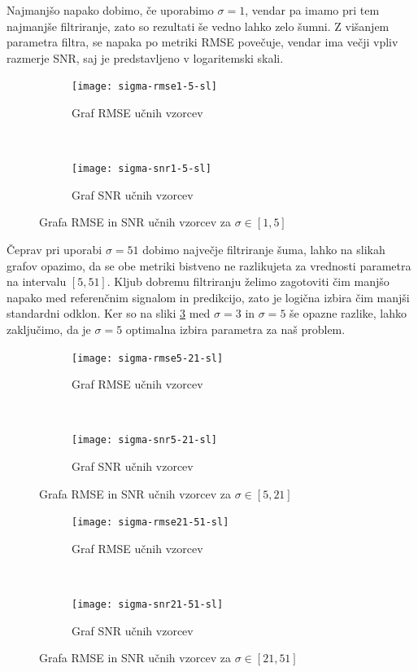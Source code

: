 Najmanjšo napako dobimo, če uporabimo $\sigma=1$, vendar pa imamo pri tem najmanjše filtriranje, zato so rezultati še vedno lahko zelo šumni. Z višanjem parametra filtra, se napaka po metriki RMSE povečuje, vendar ima večji vpliv razmerje SNR, saj je predstavljeno v logaritemski skali. 

\begin{figure}[!htb]
	\centering
	\begin{subfigure}[t]{0.45\columnwidth}
		\texttt{[image: sigma-rmse1-5-sl]}
		\caption{Graf RMSE  učnih vzorcev }
		\label{fig:sigma-rmse1-5}
	\end{subfigure}
	~
	\begin{subfigure}[t]{0.45\columnwidth}
		\texttt{[image: sigma-snr1-5-sl]}
		\caption{Graf SNR  učnih vzorcev}
		\label{fig:sigma-snr1-5}
	\end{subfigure}
	\caption{Grafa RMSE in SNR učnih vzorcev za \mbox{$\sigma \in [1,5]$}}
	\label{fig:sigma1-5}
\end{figure}

Čeprav pri uporabi $\sigma=51$ dobimo največje filtriranje šuma, lahko na slikah grafov opazimo, da se obe metriki bistveno ne razlikujeta za vrednosti parametra na intervalu $[5,51]$. Kljub dobremu filtriranju želimo zagotoviti čim manjšo napako med referenčnim signalom in predikcijo, zato je logična izbira čim manjši standardni odklon. Ker so na sliki \ref{fig:sigma1-5} med $\sigma=3$ in $\sigma=5$ še opazne razlike, lahko zaključimo, da je $\sigma=5$ optimalna izbira parametra za naš problem. 


\begin{figure}[!htb]
	\centering
	\begin{subfigure}[t]{0.45\columnwidth}
		\texttt{[image: sigma-rmse5-21-sl]}
		\caption{Graf RMSE  učnih vzorcev}
		\label{fig:sigma-rmse5-21}
	\end{subfigure}
	~
	\begin{subfigure}[t]{0.45\columnwidth}
		\texttt{[image: sigma-snr5-21-sl]}
		\caption{Graf SNR  učnih vzorcev}
		\label{fig:sigma-snr5-21}
	\end{subfigure}
	\caption{Grafa RMSE in SNR učnih vzorcev za \mbox{$\sigma \in [5,21]$}}
	\label{fig:sigma5-21}
\end{figure}



\begin{figure}[!htb]
	\centering
	\begin{subfigure}[t]{0.45\columnwidth}
		\texttt{[image: sigma-rmse21-51-sl]}
		\caption{Graf RMSE učnih vzorcev}
		\label{fig:sigma-rmse21-51}
	\end{subfigure}
	~
	\begin{subfigure}[t]{0.45\columnwidth}
		\texttt{[image: sigma-snr21-51-sl]}
		\caption{Graf SNR  učnih vzorcev}
		\label{fig:sigma-snr21-51}
	\end{subfigure}
	\caption{Grafa RMSE in SNR učnih vzorcev za \mbox{$\sigma \in [21,51]$}}
	\label{fig:sigma21-51}
\end{figure}


